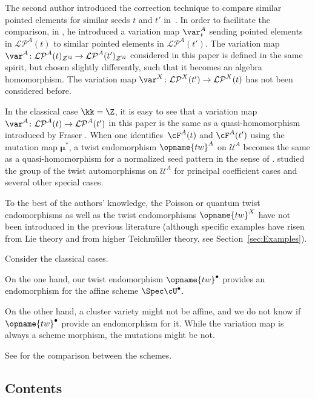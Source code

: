 \documentclass[pdftex]{sigma}
\renewcommand{\tw}{\opname{tw}}
\newcommand{\upClAlg}{\mathcal{U}^A}
\newcommand{\LP}{{\mathcal{LP}}}
\newcommand{\fFac}{\mathcal{Z}}
\newcommand{\fFacRoot}{\fFac^{\Q}}
\newcommand{\seq}{\boldsymbol{\mu}}%
\renewcommand{\tw}{\opname{tw}}
\numberwithin{equation}{section}
\begin{document}
\begin{Remark}
The second author introduced the correction technique to compare similar
pointed elements for similar seeds $t$ and $t'$ in~\cite{Qin12}.
In order to facilitate the comparison, in \cite{qin2017triangular},
he introduced a variation map $\var_{t}^{A}$ sending pointed elements
in $\LP^{A}(t)$ to similar pointed elements in $\LP^{A}(t')$. The
variation map $\var^{A}\colon\LP^{A}(t)_{\fFacRoot}\rightarrow\LP^{A}(t')_{\fFacRoot}$
considered in this paper is defined in the same spirit, but chosen
slightly differently, such that it becomes an algebra homomorphism.
The variation map $\var^{X}\colon\LP^{X}(t')\rightarrow\LP^{X}(t)$ has
not been considered before.

In the classical case $\kk=\Z$, it is easy to see that a variation map $\var^{A}\colon\LP^{A}(t)\rightarrow\LP^{A}(t')$
in this paper is the same as a quasi-homomorphism introduced by Fraser
\cite{fraser2016quasi}. When one identifies~$\cF^{A}(t)$
and $\cF^{A}(t')$ using the mutation map $\seq^{*}$, a twist endomorphism
$\tw^{A}$ on $\upClAlg$ becomes the same as a quasi-homomorphism
for a normalized seed pattern in the sense of \cite{fraser2016quasi}. \cite{chang2019cluster} studied the group of the twist automorphisms
on $\upClAlg$ for principal coefficient cases and several other special
cases.

To the best of the authors' knowledge, the Poisson or quantum twist endomorphisms
as well as the twist endomorphisms $\tw^{X}$ have not been introduced
in the previous literature (although specific examples have risen
from Lie theory and from higher Teichm\"uller theory, see Section~\ref{sec:Examples}).
\end{Remark}

\begin{Remark}
Consider the classical cases.

On the one hand, our twist endomorphism $\tw^{\bullet}$ provides
an endomorphism for the affine scheme $\Spec\cU^{\bullet}$.

On the other hand, a cluster variety might not be affine, and we do
not know if $\tw^{\bullet}$ provide an endomorphism for it. While
the variation map is always a scheme morphism, the mutations might
be not.

See \cite{gross2013birational} for the comparison between the schemes.
\end{Remark}

\subsection{Contents}
\end{document}
